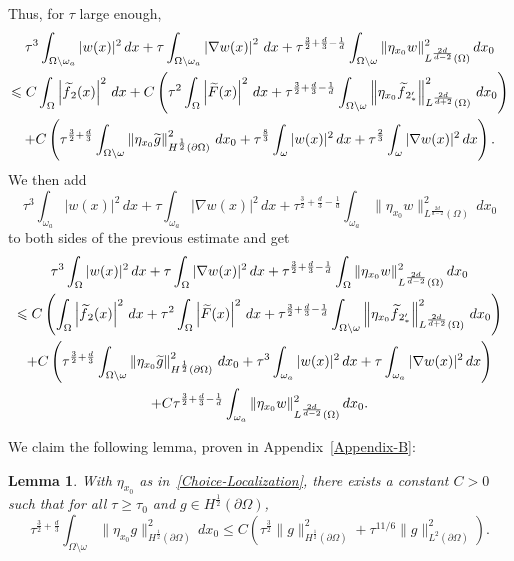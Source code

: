 \documentclass[10pt]{amsart}
\newtheorem{lemm}[theo]{Lemma}\newtheorem{prop}[theo]{Proposition}\newtheorem{coro}[theo]{Corollary}\newtheorem{conj}[theo]{Conjecture}
\theoremstyle{definition}\newtheorem{defi}[theo]{Definition}\newtheorem{rema}[theo]{Remark}\newtheorem{exam}[theo]{Example}\newtheorem{exem}[theo]{Example}\newtheorem{nota}[theo]{Notation}
\newcommand{\norm}[1]{\left\Vert#1\right\Vert}
\renewcommand{\leq}{\leqslant}
\renewcommand{\geq}{\geqslant}
\renewcommand{\tilde}{\widetilde}
\let\oldtilde\tilde
\renewcommand*{\tilde}[1]{\mathchoice{\widetilde{#1}}{\widetilde{#1}}{\oldtilde{#1}}{\oldtilde{#1}}}
\begin{document}
Thus, for $\tau$ large enough,
\begin{multline*}
\tau^3 \int_{\Omega\setminus\omega_a} |w(x)|^2 \, dx +
\tau \int_{\Omega \setminus \omega_a} \left|\nabla w(x)\right|^2 \, dx +
\tau^{\frac{3}{2}+\frac{d}{3}-\frac{1}{d}} \int_{\Omega \setminus \omega} \| \eta_{x_0} w \|_{L^{\frac{2d}{d-2}}(\Omega)}^2 \, dx_0
\\
\leq C \int_\Omega \left|\tilde f_2(x)\right|^2\, dx + C \left(
\tau^2 \int_\Omega \left|\tilde F(x)\right|^2\, dx + \tau^{\frac{3}{2}+\frac{d}{3}-\frac{1}{d}} \int_{\Omega \setminus \omega} \norm{\eta_{x_0} \tilde f_{2_*'}}_{L^{\frac{2d}{d+2}}(\Omega)}^2 \, dx_0
\right)
\\
+ C
\left(
\tau^{\frac{3}{2}+\frac{d}{3}} \int_{\Omega \setminus \omega} \norm{\eta_{x_0} \tilde g }_{H^{\frac{1}{2}}(\partial \Omega)}^2 \, dx_0 + \tau^{\frac{8}{3}} \int_\omega |w(x)|^2 \, dx +
\tau^{\frac{2}{3}} \int_\omega |\nabla w(x)|^2 \, dx
\right).
\end{multline*}
We then add
\[
\tau^3 \int_{\omega_a} |w(x)|^2 \, dx +
\tau \int_{ \omega_a} |\nabla w(x)|^2 \, dx +
\tau^{\frac{3}{2}+\frac{d}{3}-\frac{1}{d}} \int_{ \omega_a} \| \eta_{x_0} w \|_{L^{\frac{2d}{d-2}}(\Omega)}^2 \, dx_0
\]
to both sides of the previous estimate and get
\begin{multline}\label{Carleman-A-Nettoyer}
\tau^3 \int_{\Omega} |w(x)|^2 \, dx +
\tau \int_{\Omega} |\nabla w(x)|^2 \, dx +
\tau^{\frac{3}{2}+\frac{d}{3}-\frac{1}{d}} \int_{\Omega} \| \eta_{x_0} w \|_{L^{\frac{2d}{d-2}}(\Omega)}^2 \, dx_0 \\
\leq C
\left(\int_\Omega \left|\tilde f_2(x)\right|^2\, dx +\tau^2 \int_\Omega \left|\tilde F(x)\right|^2\, dx +
\tau^{\frac{3}{2}+\frac{d}{3}-\frac{1}{d}} \int_{\Omega \setminus \omega} \left\| \eta_{x_0} \tilde f_{2_*'} \right\|_{L^{\frac{2d}{d+2}}(\Omega)}^2 \, dx_0
\right)
\\
+ C
\left(
\tau^{\frac{3}{2}+\frac{d}{3}} \int_{\Omega \setminus \omega} \left\| \eta_{x_0} \tilde g \right\|_{H^{\frac{1}{2}}(\partial \Omega)}^2 \, dx_0+
\tau^{3} \int_{\omega_a} |w(x)|^2 \, dx +
\tau \int_{\omega_a} |\nabla w(x)|^2 \, dx
\right)
\\
+C
\tau^{\frac{3}{2}+\frac{d}{3}-\frac{1}{d}} \int_{\omega_a} \| \eta_{x_0} w \|_{L^{\frac{2d}{d-2}}(\Omega)}^2 \, dx_0.
\end{multline}

We claim the following lemma, proven in Appendix~\ref{Appendix-B}:

\begin{lemm}\label{Lem-Boundary-H-1/2}
With $\eta_{x_0}$ as in~\eqref{Choice-Localization}, there exists a constant $C>0$ such that for all $\tau \geq \tau_0$ and $g \in H^{\frac{1}{2}}(\partial \Omega)$,
\begin{equation}\label{Boundary-H-1/2-norms}
\tau^{\frac{3}{2}+\frac{d}{3}} \int_{\Omega \setminus \omega} \| \eta_{x_0} g \|_{H^{\frac{1}{2}}(\partial \Omega)}^2 \, dx_0
\leq C \left(
\tau^{\frac{3}{2}} \| g \|_{H^{\frac{1}{2}}(\partial \Omega)}^2 + \tau^{11/6} \|g\|_{L^2(\partial \Omega)}^2\right).
\end{equation}
\end{lemm}
\end{document}
